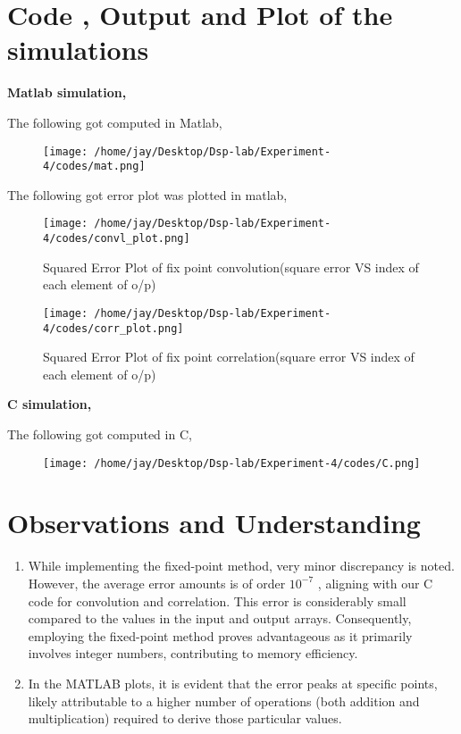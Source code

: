 \documentclass[journal,12pt,onecolumn]{IEEEtran}
\theoremstyle{remark}
\begin{document}
\section{Code , Output and Plot of the simulations}
\textbf{Matlab simulation,}

The following got computed in  Matlab,\\
\begin{figure}[h] %
  \centering
  \texttt{[image: /home/jay/Desktop/Dsp-lab/Experiment-4/codes/mat.png]}
  \label{fig:your_label}
\end{figure}
\clearpage
The following got error plot was plotted in matlab,
\begin{figure}[h] %
  \centering
  \texttt{[image: /home/jay/Desktop/Dsp-lab/Experiment-4/codes/convl\_plot.png]}
  \caption{Squared Error Plot of fix point convolution(square error VS index of each element of o/p)}
  \label{fig:your_label}
\end{figure}
\begin{figure}[h] %
  \centering
  \texttt{[image: /home/jay/Desktop/Dsp-lab/Experiment-4/codes/corr\_plot.png]}
  \caption{Squared Error Plot of fix point correlation(square error VS index of each element of o/p)}
  \label{fig:your_label}
\end{figure}
\clearpage
\textbf{C simulation,}

The following got computed in  C,\\
\begin{figure}[h] %
  \centering
  \texttt{[image: /home/jay/Desktop/Dsp-lab/Experiment-4/codes/C.png]}
  \label{fig:your_label}
\end{figure}
\section{Observations and Understanding}
\begin{enumerate}
\item 
While implementing the fixed-point method, very minor discrepancy is noted. However, the average error amounts is of order $10^{-7}$ , aligning with our C code for convolution and correlation. This error is considerably small compared to the values in the input and output arrays. Consequently, employing the fixed-point method proves advantageous as it primarily involves integer numbers, contributing to memory efficiency.
\item 
In the MATLAB plots, it is evident that the error peaks at specific points, likely attributable to a higher number of operations (both addition and multiplication) required to derive those particular values.
\end{enumerate}
\end{document}
